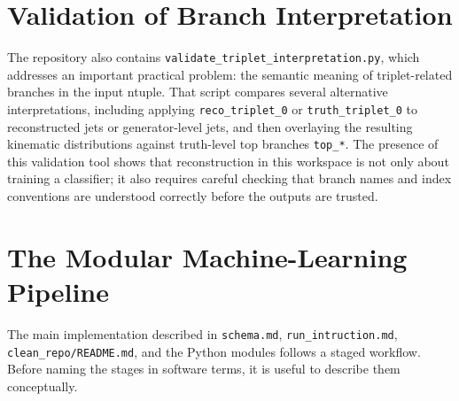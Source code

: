 \documentclass[11pt]{article}
\begin{document}
\section{Validation of Branch Interpretation}

The repository also contains \texttt{validate\_triplet\_interpretation.py}, which addresses an important practical problem: the semantic meaning of triplet-related branches in the input ntuple. That script compares several alternative interpretations, including applying \texttt{reco\_triplet\_0} or \texttt{truth\_triplet\_0} to reconstructed jets or generator-level jets, and then overlaying the resulting kinematic distributions against truth-level top branches \texttt{top\_*}. The presence of this validation tool shows that reconstruction in this workspace is not only about training a classifier; it also requires careful checking that branch names and index conventions are understood correctly before the outputs are trusted.

\section{The Modular Machine-Learning Pipeline}

The main implementation described in \texttt{schema.md}, \texttt{run\_intruction.md}, \texttt{clean\_repo/README.md}, and the Python modules follows a staged workflow. Before naming the stages in software terms, it is useful to describe them conceptually.
\end{document}
